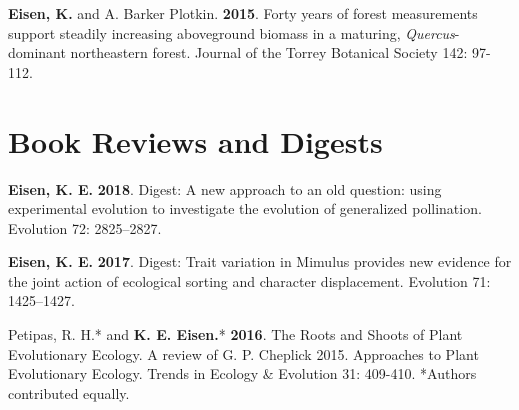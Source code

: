 \documentclass[letterpaper,11pt]{article}
\begin{document}
\begin{etaremune}
\item \textbf{Eisen, K.} and A. Barker Plotkin. \textbf{2015}. Forty years of forest measurements support steadily increasing aboveground biomass in a maturing, \textit{Quercus}-dominant northeastern forest. Journal of the Torrey Botanical Society 142: 97-112.
\end{etaremune}


\section{Book Reviews and Digests}
\begin{etaremune}
\item \textbf{Eisen, K. E.} \textbf{2018}. Digest: A new approach to an old question: using experimental evolution to investigate the evolution of generalized pollination. Evolution 72: 2825–2827.\\
\item \textbf{Eisen, K. E.} \textbf{2017}. Digest: Trait variation in Mimulus provides new evidence for the joint action of ecological sorting and character displacement. Evolution 71: 1425–1427.\\
\item Petipas, R. H.* and \textbf{K. E. Eisen.}* \textbf{2016}. The Roots and Shoots of Plant Evolutionary Ecology. A review of G. P. Cheplick 2015. Approaches to Plant Evolutionary Ecology. Trends in Ecology \& Evolution 31: 409-410. *Authors contributed equally.\\
\end{etaremune}
\end{document}

